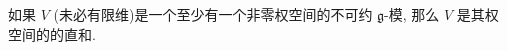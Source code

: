 
\begin{theorem}
  如果 \( V \) (未必有限维)是一个至少有一个非零权空间的不可约 \( \mathfrak{g} \)-模, 那么 \(
  V \) 是其权空间的的直和.
\end{theorem}

